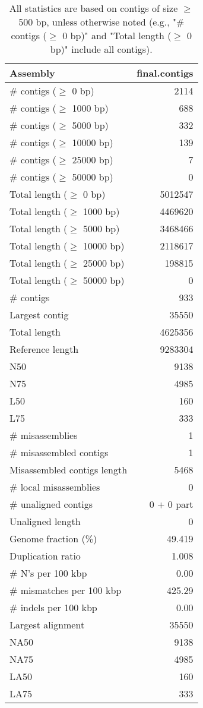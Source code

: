 \documentclass[12pt,a4paper]{article}
\begin{document}
\begin{table}[ht]
\begin{center}
\caption{All statistics are based on contigs of size $\geq$ 500 bp, unless otherwise noted (e.g., "\# contigs ($\geq$ 0 bp)" and "Total length ($\geq$ 0 bp)" include all contigs).}
\begin{tabular}{|l*{1}{|r}|}
\hline
Assembly & final.contigs \\ \hline
\# contigs ($\geq$ 0 bp) & 2114 \\ \hline
\# contigs ($\geq$ 1000 bp) & 688 \\ \hline
\# contigs ($\geq$ 5000 bp) & 332 \\ \hline
\# contigs ($\geq$ 10000 bp) & 139 \\ \hline
\# contigs ($\geq$ 25000 bp) & 7 \\ \hline
\# contigs ($\geq$ 50000 bp) & 0 \\ \hline
Total length ($\geq$ 0 bp) & 5012547 \\ \hline
Total length ($\geq$ 1000 bp) & 4469620 \\ \hline
Total length ($\geq$ 5000 bp) & 3468466 \\ \hline
Total length ($\geq$ 10000 bp) & 2118617 \\ \hline
Total length ($\geq$ 25000 bp) & 198815 \\ \hline
Total length ($\geq$ 50000 bp) & 0 \\ \hline
\# contigs & 933 \\ \hline
Largest contig & 35550 \\ \hline
Total length & 4625356 \\ \hline
Reference length & 9283304 \\ \hline
N50 & 9138 \\ \hline
N75 & 4985 \\ \hline
L50 & 160 \\ \hline
L75 & 333 \\ \hline
\# misassemblies & 1 \\ \hline
\# misassembled contigs & 1 \\ \hline
Misassembled contigs length & 5468 \\ \hline
\# local misassemblies & 0 \\ \hline
\# unaligned contigs & 0 + 0 part \\ \hline
Unaligned length & 0 \\ \hline
Genome fraction (\%) & 49.419 \\ \hline
Duplication ratio & 1.008 \\ \hline
\# N's per 100 kbp & 0.00 \\ \hline
\# mismatches per 100 kbp & 425.29 \\ \hline
\# indels per 100 kbp & 0.00 \\ \hline
Largest alignment & 35550 \\ \hline
NA50 & 9138 \\ \hline
NA75 & 4985 \\ \hline
LA50 & 160 \\ \hline
LA75 & 333 \\ \hline
\end{tabular}
\end{center}
\end{table}
\end{document}
